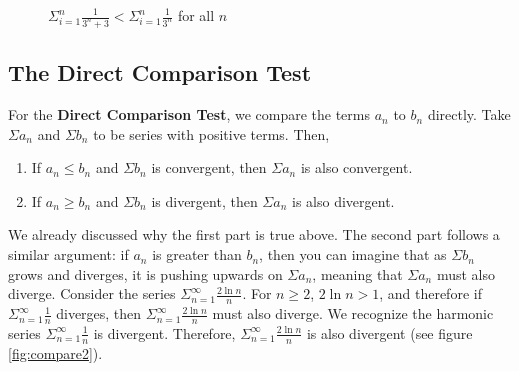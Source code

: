 \begin{figure}
    \centering
    \caption{$\Sigma_{i=1}^n \frac{1}{3^n + 3} < \Sigma_{i = 1}^n 
    \frac{1}{3^n}$ for all $n$}
    \label{fig:compare1}
\end{figure}
\subsection{The Direct Comparison Test}
For the \textbf{Direct Comparison Test}, we compare the terms $a_n$ to $b_n$ 
directly. Take $\Sigma a_n$ and $\Sigma b_n$ to be series with positive terms. 
Then, 
\begin{enumerate}
\item If $a_n \leq b_n$ and $\Sigma b_n$ is convergent, then $\Sigma a_n$ is 
also convergent.
\item If $a_n \geq b_n$ and $\Sigma b_n$ is divergent, then $\Sigma a_n$ is 
also divergent.
\end{enumerate}

We already discussed why the first part is true above. The second part follows 
a similar argument: if $a_n$ is greater than $b_n$, then you can imagine that 
as $\Sigma b_n$ grows and diverges, it is pushing upwards on $\Sigma a_n$, 
meaning that $\Sigma a_n$ must also diverge. Consider the series $\Sigma_{n=1}^
\infty \frac{2\ln{n}}{n}$. For $n \geq 2$, $2\ln{n} > 1$, and therefore if 
$\Sigma_{n=1}^\infty \frac{1}{n}$ diverges, then $\Sigma_{n=1}^\infty \frac{2
\ln{n}}{n}$ must also diverge. We recognize the harmonic series $\Sigma_{n=1}^
\infty \frac{1}{n}$ is divergent. Therefore, $\Sigma_{n=1}^\infty 
\frac{2\ln{n}}{n}$ is also divergent (see figure \ref{fig:compare2}).

